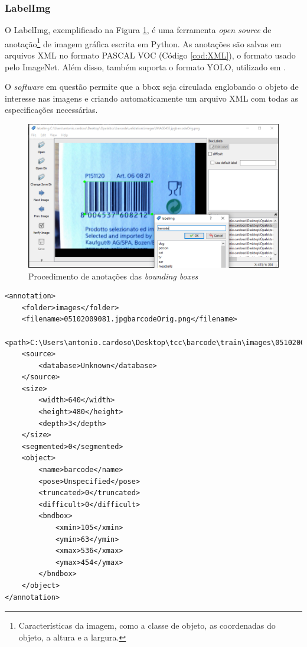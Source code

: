 \subsubsection{LabelImg}\label{sub:LabelImg}

O LabelImg, exemplificado na Figura \ref{fig:labelimg}, é uma ferramenta \textit{open source} de anotação\footnote{Características da imagem, como a classe de objeto, as coordenadas do objeto, a altura e a largura.} de imagem gráfica escrita em Python. As anotações são salvas em arquivos XML no formato PASCAL VOC (Código \ref{cod:XML}), o formato usado pelo ImageNet. Além disso, também suporta o formato YOLO, utilizado em \citeauthor{labelimg}.

O \textit{software} em questão permite que a bbox seja circulada englobando o objeto de interesse nas imagens e criando automaticamente um arquivo XML com todas as especificações necessárias.

\begin{figure}[H]
	\centering
	\includegraphics[width=0.9\linewidth]{figuras/MachineLearning/labelimg.png}
	\caption{Procedimento de anotações das \textit{bounding boxes}}
	\label{fig:labelimg}
\end{figure}

\begin{lstlisting}[caption=Arquivo XML gerado pelo LabelImg, label=cod:XML]
<annotation>
	<folder>images</folder>
	<filename>05102009081.jpgbarcodeOrig.png</filename>
	<path>C:\Users\antonio.cardoso\Desktop\tcc\barcode\train\images\05102009081.jpgbarcodeOrig.png</path>
	<source>
		<database>Unknown</database>
	</source>
	<size>
		<width>640</width>
		<height>480</height>
		<depth>3</depth>
	</size>
	<segmented>0</segmented>
	<object>
		<name>barcode</name>
		<pose>Unspecified</pose>
		<truncated>0</truncated>
		<difficult>0</difficult>
		<bndbox>
			<xmin>105</xmin>
			<ymin>63</ymin>
			<xmax>536</xmax>
			<ymax>454</ymax>
		</bndbox>
	</object>
</annotation>
\end{lstlisting}

